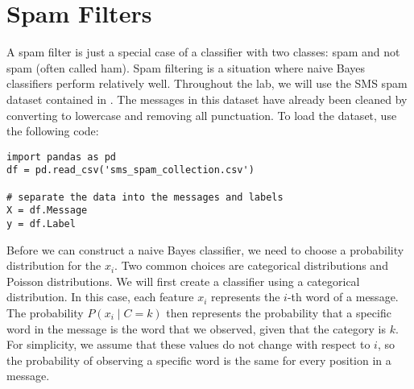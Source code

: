 \section*{Spam Filters}
A spam filter is just a special case of a classifier with two classes: spam and not spam (often called ham). 
Spam filtering is a situation where naive Bayes classifiers perform relatively well.
Throughout the lab, we will use the SMS spam dataset contained in .
The messages in this dataset have already been cleaned by converting to lowercase and removing all punctuation.
To load the dataset, use the following code:
\begin{lstlisting}
import pandas as pd
df = pd.read_csv('sms_spam_collection.csv')

# separate the data into the messages and labels
X = df.Message
y = df.Label
\end{lstlisting}

Before we can construct a naive Bayes classifier, we need to choose a probability distribution for the $x_i$.
Two common choices are categorical distributions and Poisson distributions.
We will first create a classifier using a categorical distribution.
In this case, each feature $x_i$ represents the $i$-th word of a message.
The probability $P(x_i \mid C=k)$ then represents the probability that a specific word in the message is the word that we observed, given that the category is $k$.
For simplicity, we assume that these values do not change with respect to $i$, so the probability of observing a specific word is the same for every position in a message.

